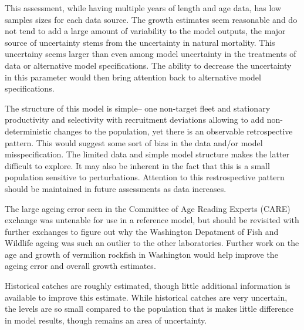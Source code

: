\documentclass[11pt,
  english,
  a4paper,
]{article}
\begin{document}
\leavevmode\tagmcend\tagstructend


This assessment, while having multiple years of length and age data, has low samples sizes for each data source. The growth estimates seem reasonable and do not tend to add a large amount of variability to the model outputs, the major source of uncertainty stems from the uncertainty in natural mortality. This uncertainy seems larger than even among model uncertainty in the treatments of data or alternative model specifications. The ability to decrease the uncertainty in this parameter would then bring attention back to alternative model specifications.

\leavevmode\tagmcend\tagstructend\par


The structure of this model is simple-- one non-target fleet and stationary productivity and selectivity with recruitment deviations allowing to add non-deterministic changes to the population, yet there is an observable retrospective pattern. This would suggest some sort of bias in the data and/or model misspecification. The limited data and simple model structure makes the latter difficult to explore. It may also be inherent in the fact that this is a small population sensitive to perturbations. Attention to this restrospective pattern should be maintained in future assessments as data increases.

\leavevmode\tagmcend\tagstructend\par


The large ageing error seen in the Committee of Age Reading Experts (CARE) exchange was untenable for use in a reference model, but should be revisited with further exchanges to figure out why the Washington Depatment of Fish and Wildlife ageing was such an outlier to the other laboratories. Further work on the age and growth of vermilion rockfish in Washington would help improve the ageing error and overall growth estimates.

\leavevmode\tagmcend\tagstructend\par


Historical catches are roughly estimated, though little additional information is available to improve this estimate. While historical catches are very uncertain, the levels are so small compared to the population that is makes little difference in model results, though remains an area of uncertainty.
\end{document}
